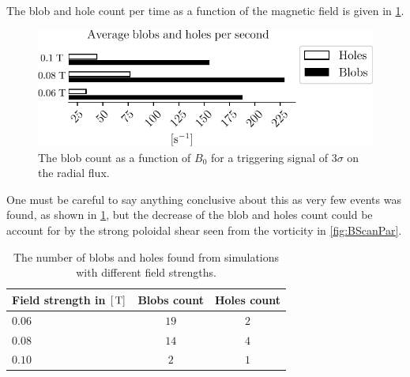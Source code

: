 The blob and hole count per time as a function of the magnetic field is given in \cref{fig:BScanBlobCount}.
%
\begin{figure}[htb]
    \centering
    \includegraphics{fig/results/bScan/BScanBlobCount}
    \caption{The blob count as a function of $B_0$ for a triggering signal of $3\sigma$ on the radial flux.}
    \label{fig:BScanBlobCount}
\end{figure}
%
One must be careful to say anything conclusive about this as very few events was found, as shown in \cref{tb:blobAndHolesCount}, but the decrease of the blob and holes count could be account for by the strong poloidal shear seen from the vorticity in \cref{fig:BScanPar}.
%
\begin{table}[h!]
\begin{center}
        \begin{tabular}{l|cc}
            \hline
            Field strength in $[\, \text{T}]$ & Blobs count & Holes count\\
            \hline
            $0.06$ & $19$ & $2$ \\
            $0.08$ & $14$ & $4$ \\
            $0.10$ & $ 2$ & $1$ \\
            \hline\hline
        \end{tabular}
        \caption{The number of blobs and holes found from simulations with different field strengths.}
        \label{tb:blobAndHolesCount}
\end{center}
\end{table}
%

